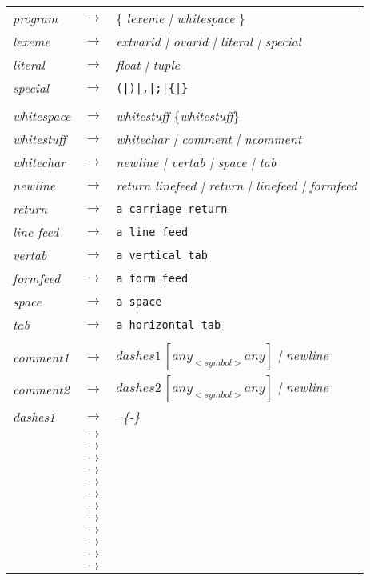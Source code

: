 \documentclass{ctexart}
\begin{document}
\begin{flushleft}
\begin{tabular}{lcl}
   \textit{program} & $\rightarrow$  &\{ \textit{lexeme | whitespace} \}\\
   \textit{lexeme} & $\rightarrow$ & \textit{extvarid | ovarid | literal | special} \\
   \textit{literal} & $\rightarrow$ & \textit{float | tuple} \\
   \textit{special} & $\rightarrow$ & \texttt{(|)|,|;|\{|\}} \\
   & &\\
   \textit{whitespace} & $\rightarrow$ & \textit{whitestuff }\{\textit{whitestuff}\} \\
   \textit{whitestuff} & $\rightarrow$ & \textit{whitechar | comment | ncomment} \\
   \textit{whitechar} & $\rightarrow$ & \textit{newline | vertab | space | tab } \\
   \textit{newline} & $\rightarrow$ & \textit{return linefeed | return | linefeed | formfeed} \\
   \textit{return} & $\rightarrow$ & \texttt{a carriage return} \\
   \textit{line feed} & $\rightarrow$ & \texttt{a line feed} \\
   \textit{vertab} & $\rightarrow$ & \texttt{a vertical tab} \\
   \textit{formfeed} & $\rightarrow$ & \texttt{a form feed} \\
   \textit{space} & $\rightarrow$ & \texttt{a space} \\
   \textit{tab} & $\rightarrow$ & \texttt{a horizontal tab} \\
   &&\\
   \textit{comment1} & $\rightarrow$ & $dashes1\,[ any_{<symbol>} {any}]$ \textit{| newline} \\
   \textit{comment2} & $\rightarrow$ & $dashes2\,[ any_{<symbol>} {any}]$ \textit{| newline} \\
   \textit{dashes1} & $\rightarrow$ & \textit{--\{-\}} \\
   & $\rightarrow$ & \\
   & $\rightarrow$ & \\
   & $\rightarrow$ & \\
   & $\rightarrow$ & \\
   & $\rightarrow$ & \\
   & $\rightarrow$ & \\
   & $\rightarrow$ & \\
   & $\rightarrow$ & \\
   & $\rightarrow$ & \\
   & $\rightarrow$ & \\
    & $\rightarrow$ & \\
    & $\rightarrow$ & \\
\end{tabular}
\end{flushleft}
\end{document}
